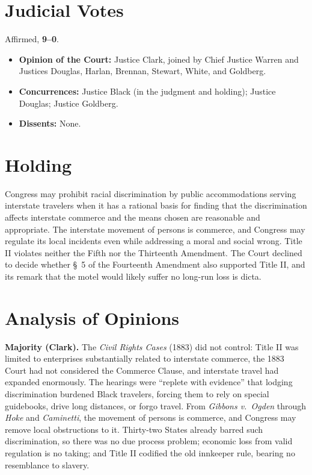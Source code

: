 \documentclass[12pt]{article}
\begin{document}
\section{Judicial Votes}

Affirmed, \textbf{9--0}.
\begin{itemize}
\item \textbf{Opinion of the Court:} Justice Clark, joined by Chief Justice Warren and Justices Douglas, Harlan, Brennan, Stewart, White, and Goldberg.
\item \textbf{Concurrences:} Justice Black (in the judgment and holding); Justice Douglas; Justice Goldberg.
\item \textbf{Dissents:} None.
\end{itemize}

\section{Holding}

Congress may prohibit racial discrimination by public accommodations serving interstate travelers when it has a rational basis for finding that the discrimination affects interstate commerce and the means chosen are reasonable and appropriate. The interstate movement of persons is commerce, and Congress may regulate its local incidents even while addressing a moral and social wrong. Title II violates neither the Fifth nor the Thirteenth Amendment. The Court declined to decide whether \S~5 of the Fourteenth Amendment also supported Title II, and its remark that the motel would likely suffer no long-run loss is dicta.

\section{Analysis of Opinions}

\textbf{Majority (Clark).} The \textit{Civil Rights Cases} (1883) did not control: Title II was limited to enterprises substantially related to interstate commerce, the 1883 Court had not considered the Commerce Clause, and interstate travel had expanded enormously. The hearings were ``replete with evidence'' that lodging discrimination burdened Black travelers, forcing them to rely on special guidebooks, drive long distances, or forgo travel. From \textit{Gibbons v.\ Ogden} through \textit{Hoke} and \textit{Caminetti}, the movement of persons is commerce, and Congress may remove local obstructions to it. Thirty-two States already barred such discrimination, so there was no due process problem; economic loss from valid regulation is no taking; and Title II codified the old innkeeper rule, bearing no resemblance to slavery.
\end{document}
